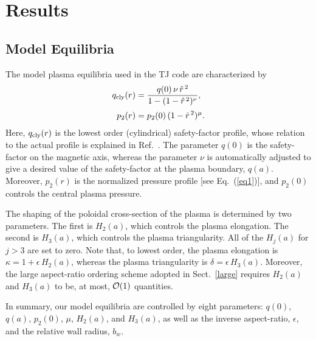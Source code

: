 \documentclass[12pt,prb,aps]{revtex4-1}
\begin{document}
\section{Results}\label{results}
\subsection{Model Equilibria}
The model plasma equilibria used in the TJ code are characterized by
\begin{align}
q_{\rm cly}(r) &= \frac{q(0)\,\nu\,\hat{r}^{\,2}}{1-(1-\hat{r}^{\,2})^\nu},\\[0.5ex]
p_2(r)&=p_2(0)\,(1-\hat{r}^{\,2})^\mu.
\end{align}
Here, $q_{\rm cly}(r)$ is the lowest order (cylindrical) safety-factor profile, whose relation to the actual profile is explained in Ref.~. The parameter $q(0)$ is the
safety-factor on the magnetic axis, whereas the parameter $\nu$ is automatically adjusted to give a desired value of the safety-factor at the plasma boundary, $q(a)$.  
Moreover, $p_2(r)$ is the normalized pressure profile [see Eq.~(\ref{eq1})], and $p_2(0)$ controls the central plasma pressure.
 
 The shaping of the
poloidal cross-section of the plasma is determined by two parameters. The first is  $H_2(a)$, which controls the plasma elongation. The second is $H_3(a)$, which
controls the plasma triangularity. All of the  $H_j(a)$ for $j>3$ are set to zero.
Note that, to lowest order, the plasma elongation is $\kappa=1+\epsilon\,H_2(a)$, whereas the plasma triangularity is $\delta =\epsilon\,H_3(a)$.\cite{eql} Moreover, the large aspect-ratio ordering scheme
adopted in Sect.~\ref{large} requires $H_2(a)$ and $H_3(a)$ to be, at most, ${\cal O}(1)$ quantities. 

In summary, our model equilibria are controlled by eight parameters: $q(0)$, $q(a)$, $p_2(0)$, $\mu$, $H_2(a)$, and $H_3(a)$, as well as the inverse aspect-ratio, $\epsilon$,
and the relative wall radius, $b_w$.  
\end{document}
